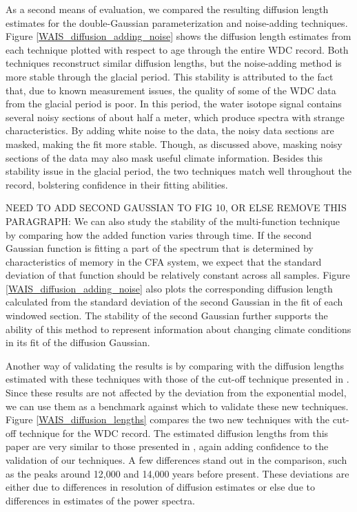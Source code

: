 \documentclass[draft, jgrga]{AGUTeX}
\begin{document}
\begin{article}
As a second means of evaluation, we compared the resulting diffusion length estimates for the double-Gaussian parameterization and noise-adding techniques. Figure \ref{WAIS_diffusion_adding_noise} shows the diffusion length estimates from each technique plotted with respect to age through the entire WDC record. Both techniques reconstruct similar diffusion lengths, but the noise-adding method is more stable through the glacial period. This stability is attributed to the fact that, due to known measurement issues, the quality of some of the WDC data from the glacial period is poor. In this period, the water isotope signal contains several noisy sections of about half a meter, which produce spectra with strange characteristics. By adding white noise to the data, the noisy data sections are masked, making the fit more stable. Though, as discussed above, masking noisy sections of the data may also mask useful climate information. Besides this stability issue in the glacial period, the two techniques match well throughout the record, bolstering confidence in their fitting abilities.

NEED TO ADD SECOND GAUSSIAN TO FIG 10, OR ELSE REMOVE THIS PARAGRAPH:
We can also study the stability of the multi-function technique by comparing how the added function varies through time. If the second Gaussian function is fitting a part of the spectrum that is determined by characteristics of memory in the CFA system, we expect that the standard deviation of that function should be relatively constant across all samples. Figure \ref{WAIS_diffusion_adding_noise} also plots the corresponding diffusion length calculated from the standard deviation of the second Gaussian in the fit of each windowed section. The stability of the second Gaussian further supports the ability of this method to represent information about changing climate conditions in its fit of the diffusion Gaussian.

Another way of validating the results is by comparing with the diffusion lengths estimated with these techniques with those of the cut-off technique presented in \cite{Jones2017a}. Since these results are not affected by the deviation from the exponential model, we can use them as a benchmark against which to validate these new techniques. Figure \ref{WAIS_diffusion_lengths} compares the two new techniques with the cut-off technique for the WDC record. The estimated diffusion lengths from this paper are very similar to those presented in \cite{Jones2017a}, again adding confidence to the validation of our techniques. A few differences stand out in the comparison, such as the peaks around 12,000 and 14,000 years before present. These deviations are either due to differences in resolution of diffusion estimates or else due to differences in estimates of the power spectra.


\end{article}
\end{document}
